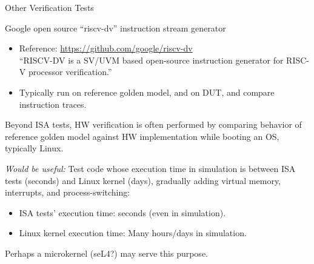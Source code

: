 \documentclass{article}
\begin{document}
\clearpage


\begin{center}
  {\Huge
    Other Verification Tests}

  \vspace*{0.5in}

  \begin{minipage}{9in}\LARGE
    Google open source ``riscv-dv'' instruction stream generator

    \begin{itemize}
    \item Reference: \url{https://github.com/google/riscv-dv} \\
    ``RISCV-DV is a SV/UVM based open-source instruction
      generator for RISC-V processor verification.''

    \item Typically run on reference golden model, and on DUT, and compare
      instruction traces.
    \end{itemize}

    \vspace*{0.5in}

    Beyond ISA tests, HW verification is often performed by comparing
    behavior of reference golden model against HW implementation while
    booting an OS, typically Linux.

    \vspace*{0.5in}

    \emph{Would be useful:} Test code whose execution time in
    simulation is between ISA tests (seconds) and Linux kernel (days),
    gradually adding virtual memory, interrupts, and
    process-switching:

    \begin{itemize}
    \item ISA tests' execution time: seconds (even in simulation).
    \item Linux kernel execution time: Many hours/days in simulation.
    \end{itemize}
    
    Perhaps a microkernel (seL4?) may serve this purpose.

  \end{minipage}
\end{center}

\clearpage

\end{document}
